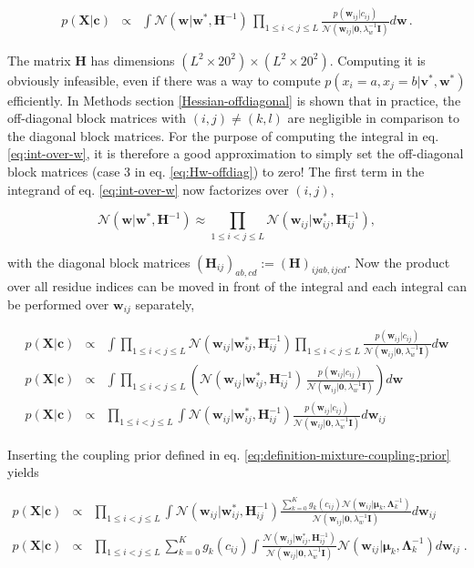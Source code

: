 \documentclass[11pt,a4paper,twoside]{book}
\newcommand{\eq}{\!=\!}
\newcommand{\Gauss}{\mathcal{N}}
\renewcommand{\H}{\mathbf{H}}
\newcommand{\I}{\mathbf{I}}
\newcommand{\Lk}{\mathbf{\Lambda}_k}
\newcommand{\muk}{\mathbf{\mu}_k}
\renewcommand{\c}{\mathbf{c}}
\newcommand{\cij}{c_{ij}}
\renewcommand{\v}{\mathbf{v}}
\newcommand{\w}{\mathbf{w}}
\newcommand{\wij}{\mathbf{w}_{ij}}
\newcommand{\X}{\mathbf{X}}
\theoremstyle{definition}
\theoremstyle{definition}
\theoremstyle{remark}
\begin{document}
\begin{eqnarray}
      p(\X | \c) &\propto& \int \Gauss (\w | \w^*, \H^{-1} ) \, \prod_{1 \le i<j \le L} \frac{p(\wij | \cij)}{\Gauss(\wij|\mathbf{0}, \lambda_w^{-1} \I)} d\w \,.
\label{eq:int-over-w}
\end{eqnarray}

The matrix \(\H\) has dimensions
\((L^2 \times 20^2) \times (L^2 \times 20^2)\). Computing it is
obviously infeasible, even if there was a way to compute
\(p(x_i \eq a, x_j \eq b| \v^*,\w^*)\) efficiently. In Methods section
\ref{Hessian-offdiagonal} is shown that in practice, the off-diagonal
block matrices with \((i,j) \ne (k,l)\) are negligible in comparison to
the diagonal block matrices. For the purpose of computing the integral
in eq. \eqref{eq:int-over-w}, it is therefore a good approximation to
simply set the off-diagonal block matrices (case 3 in eq.
\eqref{eq:Hw-offdiag}) to zero! The first term in the integrand of eq.
\eqref{eq:int-over-w} now factorizes over \((i,j)\),

\begin{equation}
  \Gauss (\w | \w^{*}, \H^{-1}) \approx \prod_{1 \le i < j \le L} \Gauss (\wij | \wij^{*}, \H_{ij}^{-1}) ,
\end{equation}

with the diagonal block matrices
\((\H_{ij})_{ab,cd} := (\H)_{ijab,ijcd}\). Now the product over all
residue indices can be moved in front of the integral and each integral
can be performed over \(\wij\) separately,

\begin{eqnarray}
  p(\X | \c) &\propto& \int \prod_{1 \le i < j \le L} \Gauss (\wij | \wij^{*}, \H_{ij}^{-1}) \prod_{1 \le i<j \le L} \frac{p(\wij | \cij)}{\Gauss(\wij|\mathbf{0}, \lambda_w^{-1} \I)} d\w  \\
  p(\X | \c) &\propto& \int \prod_{1\le i<j\le L} \left(  \Gauss (\wij | \wij^*, \H_{ij}^{-1}) \, \frac{p(\wij | \cij)}{\Gauss(\wij | \mathbf{0}, \lambda_w^{-1} \I)} \right) d\w \\
  p(\X | \c) &\propto& \prod_{1\le i<j\le L}  \int \Gauss (\wij | \wij^*, \H_{ij}^{-1}) \frac{p(\wij | \cij)}{\Gauss (\wij | \mathbf{0}, \lambda_w^{-1} \I)} d \wij 
\label{eq:int-over-w-2}
\end{eqnarray}

Inserting the coupling prior defined in eq.
\eqref{eq:definition-mixture-coupling-prior} yields

\begin{eqnarray}
   p(\X | \c) &\propto& \prod_{1\le i<j\le L} \int \Gauss (\wij | \wij^*, \H_{ij}^{-1}) \frac{\sum_{k=0}^K g_{k}(\cij) \Gauss(\wij | \muk, \Lk^{-1})}{\Gauss (\wij | \mathbf{0}, \lambda_w^{-1} \I)} d \wij \\
   p(\X | \c) &\propto& \prod_{1\le i<j\le L} \sum_{k=0}^K g_{k}(\cij) \int \frac{\Gauss (\wij | \wij^*, \H_{ij}^{-1})}{\Gauss (\wij | \mathbf{0}, \lambda_w^{-1} \I)} \Gauss(\wij | \muk, \Lk^{-1}) d\wij \; .
\label{eq:int-over-w-3}
\end{eqnarray}
\end{document}
